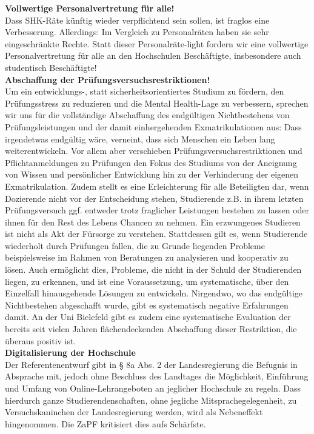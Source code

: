 \documentclass[DIV=calc]{scrartcl}
\let\oldgrqq=\grqq
\def\grqq{\oldgrqq\xspace}
\begin{document}
\textbf{Vollwertige Personalvertretung für alle!}\\
Dass SHK-Räte künftig wieder verpflichtend sein sollen, ist fraglos eine Verbesserung. Allerdings: Im Vergleich zu Personalräten haben sie sehr eingeschränkte
Rechte. Statt dieser \glqq Personalräte-light\grqq{} fordern wir eine vollwertige Personalvertretung für alle an den Hochschulen Beschäftigte, insbesondere auch studentisch Beschäftigte!\\

\textbf{Abschaffung der Prüfungsversuchsrestriktionen!}\\
Um ein entwicklungs-, statt sicherheitsorientiertes Studium zu fördern, den Prüfungsstress zu reduzieren und die Mental Health-Lage zu verbessern, sprechen wir uns für die vollständige Abschaffung des \glqq endgültigen Nichtbestehens\grqq{} von Prüfungsleistungen und der damit einhergehenden Exmatrikulationen aus:
Dass irgendetwas \glqq endgültig\grqq{} wäre, verneint, dass sich Menschen ein Leben lang weiterentwickeln. Vor allem aber verschieben Prüfungsversuchsrestriktionen und Pflichtanmeldungen zu Prüfungen den Fokus des Studiums von der Aneignung von Wissen und persönlicher Entwicklung hin zu der Verhinderung der eigenen Exmatrikulation.
Zudem stellt es eine Erleichterung für alle Beteiligten dar, wenn Dozierende nicht vor der Entscheidung stehen, Studierende z.B. in ihrem letzten Prüfungsversuch ggf. entweder trotz fraglicher Leistungen bestehen zu lassen oder ihnen für den Rest des Lebens Chancen zu nehmen.
Ein erzwungenes Studieren ist nicht als Akt der Fürsorge zu verstehen. Stattdessen gilt es, wenn Studierende wiederholt durch Prüfungen fallen, die zu Grunde liegenden Probleme beispielsweise im Rahmen von Beratungen zu analysieren und kooperativ zu lösen. Auch ermöglicht dies, Probleme, die nicht in der Schuld der Studierenden liegen, zu erkennen, und ist eine Voraussetzung, um systematische, über den Einzelfall hinausgehende Lösungen zu entwickeln.
Nirgendwo, wo das endgültige Nichtbestehen abgeschafft wurde, gibt es systematisch negative Erfahrungen damit. An der Uni Bielefeld gibt es zudem eine systematische Evaluation der bereits seit vielen Jahren flächendeckenden Abschaffung dieser Restriktion, die überaus positiv ist.\\

\textbf{Digitalisierung der Hochschule}\\
Der Referentenentwurf gibt in § 8a Abs. 2 der Landesregierung die Befugnis in Absprache mit, jedoch ohne Beschluss des Landtages die Möglichkeit, Einführung und Umfang von Online-Lehrangeboten an jeglicher Hochschule zu regeln. Dass hierdurch ganze Studierendenschaften, ohne jegliche Mitsprachegelegenheit, zu Versuchskaninchen der Landesregierung werden, wird als Nebeneffekt hingenommen. Die ZaPF kritisiert dies aufs Schärfste.
\end{document}
